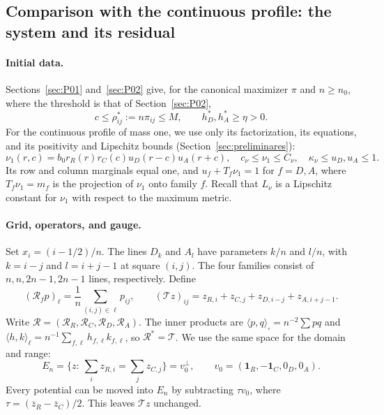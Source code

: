 \subsection{Comparison with the continuous profile: the system and its residual}\label{sec:P05}
\paragraph{Initial data.}
Sections~\ref{sec:P01} and~\ref{sec:P02} give, for the canonical maximizer $\pi$ and
$n\ge n_0$, where the threshold is that of Section~\ref{sec:P02},
\[
 c\le\rho^*_{ij}:=n\pi_{ij}\le M,\qquad h_D^*,h_A^*\ge\eta>0.
                                                        \tag{TR1}
\]
For the continuous profile of mass one, we use only its factorization, its equations,
and its positivity and Lipschitz bounds (Section~\ref{sec:preliminares}):
\[
 \nu_1(r,c)=b_0 r_R(r)r_C(c)u_D(r-c)u_A(r+c),\quad
 c_\nu\le\nu_1\le C_\nu,\quad \kappa_\nu\le u_D,u_A\le1.
                                                        \tag{TR2}
\]
Its row and column marginals equal one, and $u_f+T_f\nu_1=1$ for $f=D,A$, where $T_f\nu_1=m_f$ is
the projection of $\nu_1$ onto family $f$.
Recall that $L_\nu$ is a Lipschitz constant for $\nu_1$ with respect to the maximum metric.

\paragraph{Grid, operators, and gauge.}
Set $x_i=(i-1/2)/n$. The lines $D_k$ and $A_l$ have parameters
$k/n$ and $l/n$, with $k=i-j$ and $l=i+j-1$ at square $(i,j)$.
The four families consist of $n,n,2n-1,2n-1$ lines, respectively. Define
\[
 (\mathcal R_f p)_\ell=\frac1n\sum_{(i,j)\in\ell}p_{ij},\qquad
 (\mathcal T z)_{ij}=z_{R,i}+z_{C,j}+z_{D,i-j}+z_{A,i+j-1}.
                                                        \tag{TR3}
\]
Write $\mathcal R=(\mathcal R_R,\mathcal R_C,
\mathcal R_D,\mathcal R_A)$. The inner products are
$\langle p,q\rangle_\square=n^{-2}\sum pq$ and
$\langle h,k\rangle_\ell=n^{-1}\sum_{f,\ell}h_{f,\ell}k_{f,\ell}$,
so $\mathcal R^*=\mathcal T$. We use the same space for the domain and range:
\[
 E_n=\{z:\ \sum_i z_{R,i}=\sum_j z_{C,j}\}=v_0^\perp,\qquad
 v_0=(\mathbf1_R,-\mathbf1_C,0_D,0_A).
                                                        \tag{TR4}
\]
Every potential can be moved into $E_n$ by subtracting $\tau v_0$, where
$\tau=(\overline z_R-\overline z_C)/2$. This leaves $\mathcal Tz$ unchanged.

